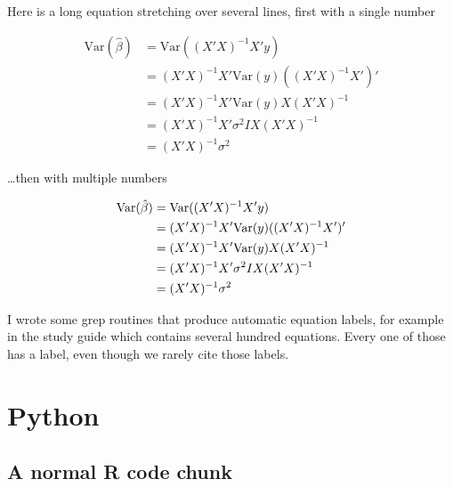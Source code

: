 \documentclass[]{book}
\newenvironment{Shaded}{\begin{snugshade}}{\end{snugshade}}
\newcommand{\DataTypeTok}[1]{\textcolor[rgb]{0.13,0.29,0.53}{#1}}
\newcommand{\KeywordTok}[1]{\textcolor[rgb]{0.13,0.29,0.53}{\textbf{#1}}}
\newcommand{\NormalTok}[1]{#1}
\newcommand{\OperatorTok}[1]{\textcolor[rgb]{0.81,0.36,0.00}{\textbf{#1}}}
\newcommand{\OtherTok}[1]{\textcolor[rgb]{0.56,0.35,0.01}{#1}}
\newcommand{\StringTok}[1]{\textcolor[rgb]{0.31,0.60,0.02}{#1}}
\begin{document}
Here is a long equation stretching over several lines, first with a single number

\begin{equation} 
\begin{split}
\mathrm{Var}(\hat{\beta}) & =\mathrm{Var}((X'X)^{-1}X'y)\\
 & =(X'X)^{-1}X'\mathrm{Var}(y)((X'X)^{-1}X')'\\
 & =(X'X)^{-1}X'\mathrm{Var}(y)X(X'X)^{-1}\\
 & =(X'X)^{-1}X'\sigma^{2}IX(X'X)^{-1}\\
 & =(X'X)^{-1}\sigma^{2}
\end{split}
\label{eq:var-beta1}
\end{equation}

\ldots{}then with multiple numbers

\begin{align}
\mathrm{Var}(\hat{\beta}) & =\mathrm{Var}((X'X)^{-1}X'y) \notag \\
 & =(X'X)^{-1}X'\mathrm{Var}(y)((X'X)^{-1}X')'\label{eq:var-a}\\ 
 & =(X'X)^{-1}X'\mathrm{Var}(y)X(X'X)^{-1}\label{eq:var-b}\\ 
 & =(X'X)^{-1}X'\sigma^{2}IX(X'X)^{-1}\label{eq:var-c}\\ 
 & =(X'X)^{-1}\sigma^{2} \label{eq:var-d}
\end{align}

I wrote some grep routines that produce automatic equation labels, for example in the study guide which contains several hundred equations. Every one of those has a label, even though we rarely cite those labels.

\hypertarget{python}{%
\chapter{Python}\label{python}}

\hypertarget{a-normal-r-code-chunk}{%
\section{A normal R code chunk}\label{a-normal-r-code-chunk}}

\begin{Shaded}
\end{Shaded}
\end{document}
